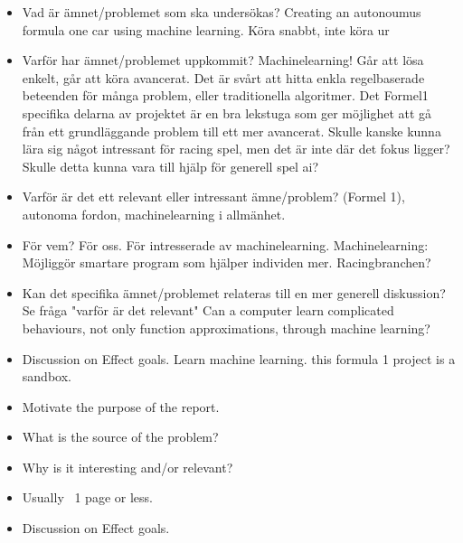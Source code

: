 \begin{itemize}
    \item Vad är ämnet/problemet som ska undersökas?  
    Creating an autonoumus formula one car using machine learning.
        Köra snabbt, inte köra ur
        
    \item Varför har ämnet/problemet uppkommit? 
    Machinelearning! Går att lösa enkelt, går att köra avancerat.
    Det är svårt att hitta enkla regelbaserade beteenden för många problem, eller traditionella algoritmer. Det Formel1 specifika delarna av projektet är en bra lekstuga som ger möjlighet att gå från ett grundläggande problem till ett mer avancerat.
    Skulle kanske kunna lära sig något intressant för racing spel, men det är inte där det fokus ligger? Skulle detta kunna vara till hjälp för generell spel ai?
    
    \item Varför är det ett relevant eller intressant ämne/problem? 
    (Formel 1), autonoma fordon, machinelearning i allmänhet.
    
    \item För vem? 
    För oss. För intresserade av machinelearning. 
    Machinelearning: Möjliggör smartare program som hjälper individen mer. Racingbranchen?
    
    \item Kan det specifika ämnet/problemet relateras till en mer generell diskussion? 
    Se fråga "varför är det relevant"
    Can a computer learn complicated behaviours, not only function approximations, through machine learning?
    
    \item Discussion on Effect goals. 
    Learn machine learning. this formula 1 project is a sandbox.
    
\end{itemize}

\begin{itemize}
  \item Motivate the purpose of the report.
  \item What is the source of the problem?
  \item Why is it interesting and/or relevant?
  \item Usually ~1 page or less.
  \item Discussion on Effect goals.
\end{itemize}

